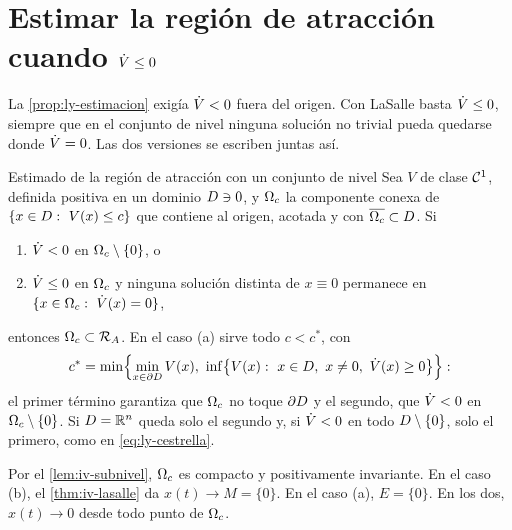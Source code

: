 \section{Estimar la región de atracción cuando $\dot V\le0$}
\label{sec:iv-region}

La \cref{prop:ly-estimacion} exigía $\dot V<0$ fuera del origen. Con LaSalle basta $\dot V\le0$, siempre que en el conjunto de nivel ninguna solución no trivial pueda quedarse donde $\dot V=0$. Las dos versiones se escriben juntas así.

\begin{proposicion}[label=prop:iv-estimacion]{Estimado de la región de atracción con un conjunto de nivel}
Sea $V$ de clase $\mathcal{C}^{1}$, definida positiva en un dominio $D\ni0$, y $\Omega_{c}$ la componente conexa de $\{x\in D:\ V(x)\le c\}$ que contiene al origen, acotada y con $\overline{\Omega_{c}}\subset D$. Si
\begin{enumerate}
  \item[(a)] $\dot V<0$ en $\Omega_{c}\setminus\{0\}$, o
  \item[(b)] $\dot V\le0$ en $\Omega_{c}$ y ninguna solución distinta de $x\equiv0$ permanece en $\{x\in\Nivel c:\ \Vdot(x)=0\}$,
\end{enumerate}
entonces $\Omega_{c}\subset\mathcal{R}_A$. En el caso (a) sirve todo $c<c^*$, con
\begin{equation}
  c^*=\min\Bigl\{\min_{x\in\partial\D}V(x),\ \inf\bigl\{V(x):\ x\in\D,\ x\neq0,\ \Vdot(x)\ge0\bigr\}\Bigr\}:
  \label{eq:iv-cestrella}
\end{equation}
el primer término garantiza que $\Omega_{c}$ no toque $\partial D$ y el segundo, que $\dot V<0$ en $\Omega_{c}\setminus\{0\}$. Si $D=\mathbb{R}^n$ queda solo el segundo y, si $\dot V<0$ en todo $D\setminus\{0\}$, solo el primero, como en \eqref{eq:ly-cestrella}.
\end{proposicion}

\begin{demostracion}
Por el \cref{lem:iv-subnivel}, $\Omega_{c}$ es compacto y positivamente invariante. En el caso (b), el \cref{thm:iv-lasalle} da $x(t)\to M=\{0\}$. En el caso (a), $E=\{0\}$. En los dos, $x(t)\to0$ desde todo punto de $\Omega_{c}$.
\end{demostracion}


